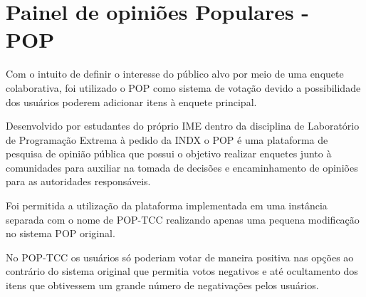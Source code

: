 \section{Painel de opiniões Populares - POP}
\par Com o intuito de definir o interesse do público alvo por meio de uma enquete colaborativa, foi utilizado o POP como sistema de votação devido a possibilidade dos usuários poderem adicionar itens à enquete principal.
\par Desenvolvido por estudantes do próprio IME dentro da disciplina de Laboratório de Programação Extrema à pedido da INDX o POP é uma plataforma de pesquisa de opinião pública que possui o objetivo realizar enquetes junto à comunidades para auxiliar na tomada de decisões e encaminhamento de opiniões para as autoridades responsáveis.
\par Foi permitida a utilização da plataforma implementada em uma instância separada com o nome de POP-TCC realizando apenas uma pequena modificação no sistema POP original.
\par No POP-TCC os usuários só poderiam votar de maneira positiva nas opções ao contrário do sistema original que permitia votos negativos e até ocultamento dos itens que obtivessem um grande número de negativações pelos usuários.

